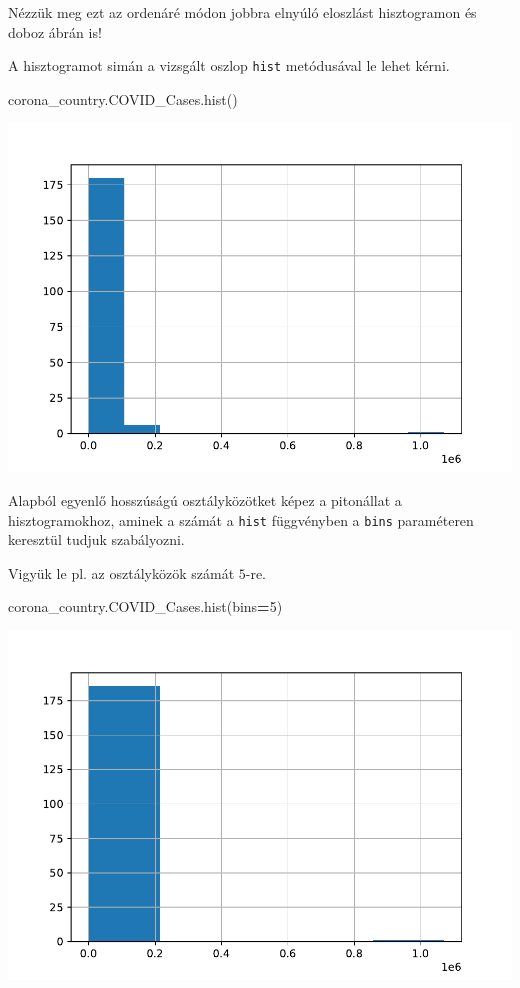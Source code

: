 \documentclass[
]{book}
\newenvironment{Shaded}{\begin{snugshade}}{\end{snugshade}}
\newcommand{\DecValTok}[1]{\textcolor[rgb]{0.00,0.00,0.81}{#1}}
\newcommand{\NormalTok}[1]{#1}
\newcommand{\OperatorTok}[1]{\textcolor[rgb]{0.81,0.36,0.00}{\textbf{#1}}}
\begin{document}
Nézzük meg ezt az ordenáré módon jobbra elnyúló eloszlást hisztogramon és doboz ábrán is!

A hisztogramot simán a vizsgált oszlop \texttt{hist} metódusával le lehet kérni.

\begin{Shaded}
\begin{Highlighting}[]
\NormalTok{corona\_country.COVID\_Cases.hist()}
\end{Highlighting}
\end{Shaded}

\includegraphics{_main_files/figure-latex/unnamed-chunk-95-3.pdf}

Alapból egyenlő hosszúságú osztályközötket képez a pitonállat a hisztogramokhoz, aminek a számát a \texttt{hist} függvényben a \texttt{bins} paraméteren keresztül tudjuk szabályozni.

Vigyük le pl. az osztályközök számát \(5\)-re.

\begin{Shaded}
\begin{Highlighting}[]
\NormalTok{corona\_country.COVID\_Cases.hist(bins}\OperatorTok{=}\DecValTok{5}\NormalTok{)}
\end{Highlighting}
\end{Shaded}

\includegraphics{_main_files/figure-latex/unnamed-chunk-96-5.pdf}
\end{document}
